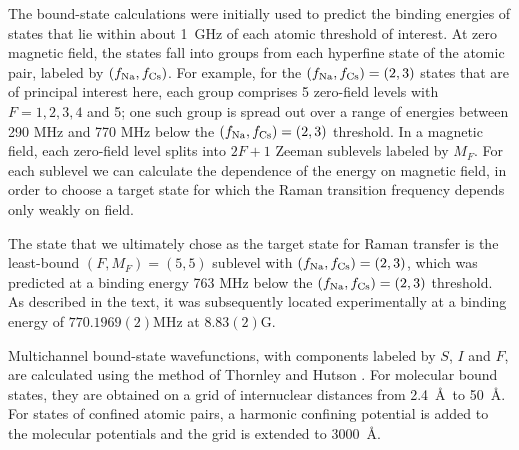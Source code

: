 \documentclass[aps,prx,secnumarabic,amsmath,amssymb,10pt,superscriptaddress]{revtex4-2}
\begin{document}
The bound-state calculations were initially used to predict the binding energies of states that lie
within about 1~GHz of each atomic threshold of interest. At zero magnetic field, the states fall
into groups from each hyperfine state of the atomic pair, labeled by $(f_{\rm Na},f_{\rm Cs})$. For
example, for the $(f_{\rm Na},f_{\rm Cs}) = (2,3)$ states that are of principal interest here, each
group comprises 5 zero-field levels with $F=1,2,3,4$ and 5; one such group is spread out over a
range of energies between 290 MHz and 770 MHz below the $(f_{\rm Na},f_{\rm Cs}) = (2,3)$
threshold. In a magnetic field, each zero-field level splits into $2F+1$ Zeeman sublevels labeled
by $M_F$. For each sublevel we can calculate the dependence of the energy on magnetic field, in
order to choose a target state for which the Raman transition frequency depends only weakly on
field.

The state that we ultimately chose as the target state for Raman transfer is the least-bound
$(F,M_F)=(5,5)$ sublevel with $(f_{\rm Na},f_{\rm Cs}) = (2,3)$, which was predicted at a binding
energy 763 MHz below the $(f_{\rm Na},f_{\rm Cs}) = (2,3)$ threshold. As described in the text, it
was subsequently located experimentally at a binding energy of $ 770.1969(2) \mathrm{MHz} $ at $ 8.83(2) \mathrm{G} $.

Multichannel bound-state wavefunctions, with components labeled by $S$, $I$ and $F$, are calculated
using the method of Thornley and Hutson \cite{Thornley1994}. For molecular bound states, they are
obtained on a grid of internuclear distances from 2.4~\AA\ to 50~\AA. For states of confined atomic
pairs, a harmonic confining potential is added to the molecular potentials and the grid is extended
to 3000~\AA.
\end{document}
